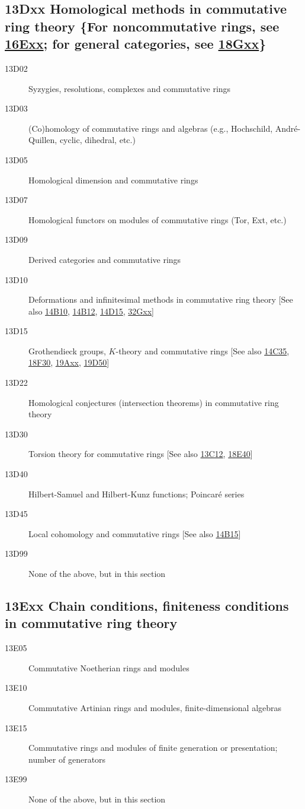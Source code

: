 \documentclass[letterpaper]{article}
\begin{document}
\subsection*{13Dxx Homological methods in commutative ring theory \{For noncommutative rings, see \hyperref[16Exx]{16Exx}; for general categories, see \hyperref[18Gxx]{18Gxx}\} }\label{13Dxx}
\begin{description}               
\item [13D02]\label{13D02} Syzygies, resolutions, complexes and commutative rings
\item [13D03]\label{13D03} (Co)homology of commutative rings and algebras (e.g., Hochschild, Andr\'{e}-Quillen, cyclic, dihedral, etc.)
\item [13D05]\label{13D05} Homological dimension and commutative rings
\item [13D07]\label{13D07} Homological functors on modules of commutative rings (Tor, Ext, etc.)
\item [13D09]\label{13D09} Derived categories and commutative rings
\item [13D10]\label{13D10} Deformations and infinitesimal methods in commutative ring theory [See also \hyperref[14B10]{14B10}, \hyperref[14B12]{14B12}, \hyperref[14D15]{14D15}, \hyperref[32Gxx]{32Gxx}]
\item [13D15]\label{13D15} Grothendieck groups, $K$-theory and commutative rings [See also \hyperref[14C35]{14C35}, \hyperref[18F30]{18F30}, \hyperref[19Axx]{19Axx}, \hyperref[19D50]{19D50}]
\item [13D22]\label{13D22} Homological conjectures (intersection theorems) in commutative ring theory
\item [13D30]\label{13D30} Torsion theory for commutative rings [See also \hyperref[13C12]{13C12}, \hyperref[18E40]{18E40}]
\item [13D40]\label{13D40} Hilbert-Samuel and Hilbert-Kunz functions; Poincar\'{e} series
\item [13D45]\label{13D45} Local cohomology and commutative rings [See also \hyperref[14B15]{14B15}]
\item [13D99]\label{13D99} None of the above, but in this section
\end{description}          
\subsection*{13Exx Chain conditions, finiteness conditions in commutative ring theory}\label{13Exx}
\begin{description}
\item [13E05]\label{13E05} Commutative Noetherian rings and modules
\item [13E10]\label{13E10} Commutative Artinian rings and modules, finite-dimensional algebras
\item [13E15]\label{13E15} Commutative rings and modules of finite generation or presentation; number of generators
\item [13E99]\label{13E99} None of the above, but in this section
\end{description}          
\end{document}
